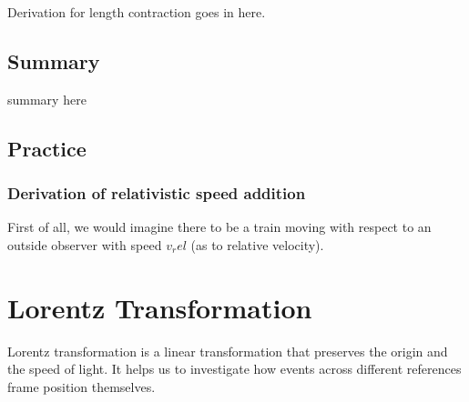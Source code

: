\documentclass[12pt]{book}
\begin{document}
Derivation for length contraction goes in here.



\subsection{Summary}

summary here

\subsection{Practice}
\subsubsection{Derivation of relativistic speed addition}
First of all, we would imagine there to be a train moving with respect to an outside observer with speed $v_rel$ (as to relative velocity).

\section{Lorentz Transformation}
Lorentz transformation is a linear transformation that preserves the origin and the speed of light. It helps us to investigate how events across different references frame position themselves.
\end{document}
